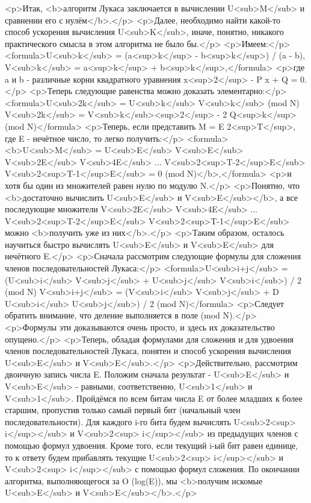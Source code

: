<p>Итак, <b>алгоритм Лукаса заключается в вычислении U<sub>M</sub> и сравнении его с нулём</b>.</p>
<p>Далее, необходимо найти какой-то способ ускорения вычисления U<sub>K</sub>, иначе, понятно, никакого практического смысла в этом алгоритма не было бы.</p>
<p>Имеем:</p>
<formula>U<sub>k</sub> = (a<sup>k</sup> - b<sup>k</sup>) / (a - b),
V<sub>k</sub> = a<sup>k</sup> + b<sup>k</sup>,</formula>
<p>где a и b - различные корни квадратного уравнения x<sup>2</sup> - P x + Q = 0.</p>
<p>Теперь следующие равенства можно доказать элементарно:</p>
<formula>U<sub>2k</sub> = U<sub>k</sub> V<sub>k</sub> (mod N)
V<sub>2k</sub> = V<sub>k</sub><sup>2</sup> - 2 Q<sup>k</sup> (mod N)</formula>
<p>Теперь, если представить M = E 2<sup>T</sup>, где E - нечётное число, то легко получить:</p>
<formula><b>U<sub>M</sub> = U<sub>E</sub> V<sub>E</sub> V<sub>2E</sub> V<sub>4E</sub> ... V<sub>2<sup>T-2</sup>E</sub> V<sub>2<sup>T-1</sup>E</sub> = 0 (mod N)</b>,</formula>
<p>и хотя бы один из множителей равен нулю по модулю N.</p>
<p>Понятно, что <b>достаточно вычислить U<sub>E</sub> и V<sub>E</sub></b>, а все последующие множители V<sub>2E</sub> V<sub>4E</sub> ... V<sub>2<sup>T-2</sup>E</sub> V<sub>2<sup>T-1</sup>E</sub> можно <b>получить уже из них</b>.</p>
<p>Таким образом, осталось научиться быстро вычислять U<sub>E</sub> и V<sub>E</sub> для нечётного E.</p>
<p>Сначала рассмотрим следующие формулы для сложения членов последовательностей Лукаса:</p>
<formula>U<sub>i+j</sub> = (U<sub>i</sub> V<sub>j</sub> + U<sub>j</sub> V<sub>i</sub>) / 2 (mod N)
V<sub>i+j</sub> = (V<sub>i</sub> V<sub>j</sub> + D U<sub>i</sub> U<sub>j</sub>) / 2 (mod N)</formula>
<p>Следует обратить внимание, что деление выполняется в поле (mod N).</p>
<p>Формулы эти доказываются очень просто, и здесь их доказательство опущено.</p>
<p>Теперь, обладая формулами для сложения и для удвоения членов последовательностей Лукаса, понятен и способ ускорения вычисления U<sub>E</sub> и V<sub>E</sub>.</p>
<p>Действительно, рассмотрим двоичную запись числа E. Положим сначала результат - U<sub>E</sub> и V<sub>E</sub> - равными, соответственно, U<sub>1</sub> и V<sub>1</sub>. Пройдёмся по всем битам числа E от более младших к более старшим, пропустив только самый первый бит (начальный член последовательности). Для каждого i-го бита будем вычислять U<sub>2<sup> i</sup></sub> и V<sub>2<sup> i</sup></sub> из предыдущих членов с помощью формул удвоения. Кроме того, если текущий i-ый бит равен единице, то к ответу будем прибавлять текущие U<sub>2<sup> i</sup></sub> и V<sub>2<sup> i</sup></sub> с помощью формул сложения. По окончании алгоритма, выполняющегося за O (log(E)), мы <b>получим искомые U<sub>E</sub> и V<sub>E</sub></b>.</p>
